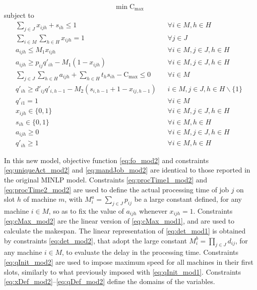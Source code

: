 \documentclass[a4paper,11pt]{article}
\begin{document}
\begin{equation}\label{eq:fo_mod2}
	\min \text{C}_{\max}
\end{equation}
\qquad subject to
\begin{eqnarray}
\label{eq:uniqueAct_mod2} \sum_{j \in J}{x_{ijh}} +  s_{ih} \leq 1 && \forall i \in M, h \in H \\
\label{eq:mandJob_mod2} \sum_{i \in M}\sum_{h \in H}{x_{ijh}} = 1 && \forall j \in J\\
\label{eq:procTime1_mod2} a_{ijh} \leq M_1 x_{ijh} && \forall i \in M, j \in J, h \in H\\
\label{eq:procTime2_mod2} a_{ijh} \geq p_{ij} q'_{ih} - M_1 (1-x_{ijh}) &&\forall i \in M, j \in J, h \in H\\
\label{eq:cMax_mod2} \sum_{j \in J}\sum_{h \in H} a_{ijh} + \sum_{h \in H} t_h s_{ih} - \text{C}_{\max} \leq 0 && \forall i \in M\\
\label{eq:det_mod2} q'_{ih} \geq d'_{ij} q'_{i,h-1} - M_2(s_{i,h-1}+1-x_{ij,h-1}) && i \in M, j \in J,  h \in H\backslash\{1\}\\
\label{eq:qInit_mod2} q'_{i1} = 1 && \forall i \in M\\
\label{eq:xDef_mod2} x_{ijh} \in \{0,1\} && \forall i \in M,  j \in J, h \in H\\
\label{eq:dDef_mod2} s_{ih} \in \{0,1\} && \forall i \in M, h \in H\\
\label{eq:aDef_mod2} a_{ijh} \geq 0 && \forall i \in M, j \in J,  h \in H\\
\label{eq:qDef_mod2} q'_{ih} \geq 1 && \forall  i \in M, h \in H
\end{eqnarray}

In this new model, objective function \eqref{eq:fo_mod2} and constraints \eqref{eq:uniqueAct_mod2} and \eqref{eq:mandJob_mod2} are identical to those reported in the original MINLP model. Constraints \eqref{eq:procTime1_mod2} and \eqref{eq:procTime2_mod2} are used to define the actual processing time of job $j$ on slot $h$ of machine $m$, with $M^a_i = \sum_{j \in J}{p_{ij}}$ be a large constant defined, for any machine $i \in M$, so as to fix the value of $a_{ijh}$ whenever $x_{ijh}=1$. 
Constraints \eqref{eq:cMax_mod2} are the linear version of \eqref{eq:cMax_mod1}, and are used to calculate the makespan. 
The linear representation of \eqref{eq:det_mod1} is obtained by constraints \eqref{eq:det_mod2}, that adopt the large constant $M^b_i = \prod_{j \in J}{d_{ij}}$, for any machine $i \in M$, to evaluate the delay in the processing time. Constraints \eqref{eq:qInit_mod2} are used to impose maximum speed for all machines in their first slots, similarly to what previously imposed with \eqref{eq:qInit_mod1}. Constraints \eqref{eq:xDef_mod2}--\eqref{eq:qDef_mod2} define the domains of the variables.
\end{document}
